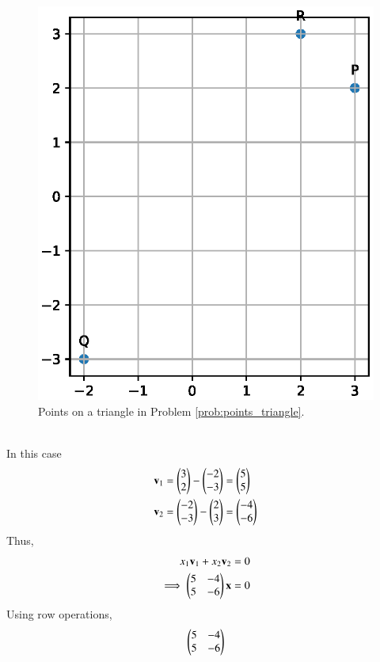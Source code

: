 \begin{enumerate}[label=\thesection.\arabic*.,ref=\thesection.\theenumi]
\begin{figure}
\includegraphics[width=\columnwidth]{./figs/line/points_triangle.eps}
\caption{ Points on a triangle in Problem \ref{prob:points_triangle}.}%
\label{fig:points_triangle}
\end{figure}
\\
\solution In this case
\begin{align}
\mathbf{v}_1 &= \begin{pmatrix}3\\2\end{pmatrix}-\begin{pmatrix}-2\\-3\end{pmatrix}=\begin{pmatrix}5\\5\end{pmatrix}
\\
\mathbf{v}_2 &= \begin{pmatrix}-2\\-3\end{pmatrix}-\begin{pmatrix}2\\3\end{pmatrix} = \begin{pmatrix}-4\\-6\end{pmatrix}
\end{align}
Thus,
\begin{align}
\label{eq:lin_indep}
x_1\mathbf{v}_1+x_2\mathbf{v}_2 &= 0 
\\
\implies \begin{pmatrix}5 & -4 \\ 5 & -6\end{pmatrix}\mathbf{x} & = 0
\end{align}
Using row operations,
\begin{align}
\myvec{5 & -4\\ 5 & -6}

\end{align}
\end{enumerate}
